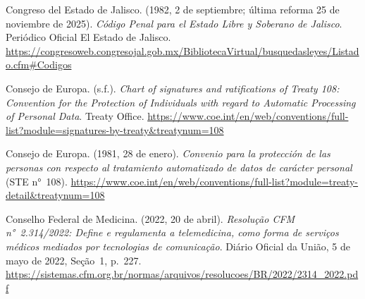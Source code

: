\documentclass[12pt, a4paper]{article}
\begin{document}
\begin{list}{}{\setlength{\leftmargin}{1.27cm}\setlength{\itemindent}{-1.27cm}%
  \setlength{\labelwidth}{0pt}\setlength{\labelsep}{0pt}\setlength{\itemsep}{6pt}}
\item Congreso del Estado de Jalisco. (1982, 2 de septiembre; última
  reforma 25 de noviembre de 2025). \textit{Código Penal para el Estado
  Libre y Soberano de Jalisco}. Periódico Oficial El Estado de Jalisco. \url{https://congresoweb.congresojal.gob.mx/BibliotecaVirtual/busquedasleyes/Listado.cfm\#Codigos}
 
 
\item Consejo de Europa. (s.f.). \textit{Chart of signatures and
  ratifications of Treaty 108: Convention for the Protection of
  Individuals with regard to Automatic Processing of Personal Data}.
  Treaty Office. \url{https://www.coe.int/en/web/conventions/full-list?module=signatures-by-treaty&treatynum=108}
 

\item Consejo de Europa. (1981, 28 de enero). \textit{Convenio para
  la protección de las personas con respecto al tratamiento
  automatizado de datos de carácter personal} (STE n°~108).
  \url{https://www.coe.int/en/web/conventions/full-list?module=treaty-detail&treatynum=108}

 
\item Conselho Federal de Medicina. (2022, 20 de abril).
  \textit{Resolução CFM n°~2.314/2022: Define e regulamenta a
  telemedicina, como forma de serviços médicos mediados por tecnologias de comunicação}. Diário Oficial da União, 5 de mayo
  de 2022, Seção~1, p.~227. \url{https://sistemas.cfm.org.br/normas/arquivos/resolucoes/BR/2022/2314_2022.pdf}
 
 

\end{list}
\end{document}
